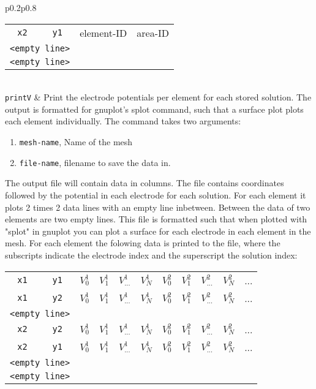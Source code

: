 \documentclass[noshowpacs,preprintnumbers,amsmath,amssymb, letter]{revtex4}
\begin{document}
\begin{longtable}{p{}p{}}
\begin{tabular}{cccc}
	\texttt{x2} & \texttt{y1} & element-ID & area-ID \\
	\multicolumn{2}{l}{\texttt{<empty line>}}\\
	\multicolumn{2}{l}{\texttt{<empty line>}}\\
\end{tabular}\\
\texttt{printV}		& Print the electrode potentials per element for each stored solution. The output is formatted for gnuplot's splot command, such that a surface plot plots each element individually. The command takes two arguments:
\begin{enumerate}
\item \texttt{mesh-name}, Name of the mesh
\item \texttt{file-name}, filename to save the data in.
\end{enumerate}
The output file will contain data in columns. The file contains coordinates followed by the potential in each electrode for each solution. For each element it plots 2 times 2 data lines with an empty line inbetween. Between the data of two elements are two empty lines. This file is formatted such that when plotted with "splot" in gnuplot you can plot a surface for each electrode in each element in the mesh. For each element the folowing data is printed to the file, where the subscripts indicate the electrode index and the superscript the solution index:\newline 
\begin{tabular}{ccccccccccc}
	\texttt{x1} & \texttt{y1} & $V_0^1$ & $V_1^1$ & $V_{...}^1$ & $V_N^1$ & $V_0^2$ & $V_1^2$ & $V_{...}^2$ & $V_N^2$& ...\\
	\texttt{x1} & \texttt{y2} & $V_0^1$ & $V_1^1$ & $V_{...}^1$ & $V_N^1$ & $V_0^2$ & $V_1^2$ & $V_{...}^2$ & $V_N^2$& ...\\
	\multicolumn{2}{l}{\texttt{<empty line>}}\\
	\texttt{x2} & \texttt{y2} & $V_0^1$ & $V_1^1$ & $V_{...}^1$ & $V_N^1$ & $V_0^2$ & $V_1^2$ & $V_{...}^2$ & $V_N^2$& ...\\
	\texttt{x2} & \texttt{y1} & $V_0^1$ & $V_1^1$ & $V_{...}^1$ & $V_N^1$ & $V_0^2$ & $V_1^2$ & $V_{...}^2$ & $V_N^2$& ...\\
	\multicolumn{2}{l}{\texttt{<empty line>}}\\
	\multicolumn{2}{l}{\texttt{<empty line>}}\\
\end{tabular}\\

\end{longtable}
\end{document}
